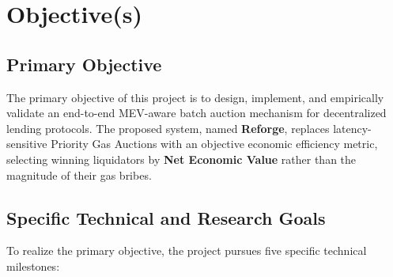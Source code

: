 \chapter{Objective(s)}
\label{chap:objectives}

\section{Primary Objective}
The primary objective of this project is to design, implement, and empirically validate an end-to-end MEV-aware batch auction mechanism for decentralized lending protocols. The proposed system, named \textbf{Reforge}, replaces latency-sensitive Priority Gas Auctions with an objective economic efficiency metric, selecting winning liquidators by \textbf{Net Economic Value} rather than the magnitude of their gas bribes.

\section{Specific Technical and Research Goals}
To realize the primary objective, the project pursues five specific technical milestones:

